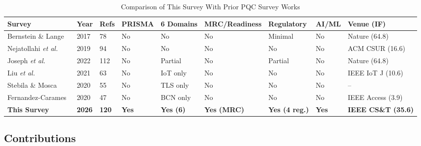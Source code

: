 \documentclass[journal]{IEEEtran}
\begin{document}
\begin{table}[t]
\caption{Comparison of This Survey With Prior PQC Survey Works}
\label{tab:survey_comparison}
\centering
\footnotesize
\renewcommand{\arraystretch}{1.2}
\begin{tabular}{@{}L{3.0cm}C{1.2cm}C{1.2cm}C{1.2cm}C{1.2cm}C{1.4cm}C{1.2cm}C{1.2cm}C{1.4cm}@{}}
\toprule
\textbf{Survey} & \textbf{Year} & \textbf{Refs} & \textbf{PRISMA} & \textbf{6 Domains} & \textbf{MRC/Readiness} & \textbf{Regulatory} & \textbf{AI/ML} & \textbf{Venue (IF)} \\
\midrule
Bernstein \& Lange~\cite{bernstein2017postquantum} & 2017 & 78 & No & No & No & Minimal & No & Nature (64.8) \\
Nejatollahi \emph{et al.}~\cite{nejatollahi2019post} & 2019 & 94 & No & No & No & No & No & ACM CSUR (16.6) \\
Joseph \emph{et al.}~\cite{joseph2022transitioning} & 2022 & 112 & No & Partial & No & Partial & No & Nature (64.8) \\
Liu \emph{et al.}~\cite{liu2021pqc} & 2021 & 63 & No & IoT only & No & No & No & IEEE IoT J (10.6) \\
Stebila \& Mosca~\cite{stebila2020postquantum} & 2020 & 55 & No & TLS only & No & No & No & -- \\
Fernandez-Carames~\cite{fernandezcarames2020review} & 2020 & 47 & No & BCN only & No & No & No & IEEE Access (3.9) \\
\midrule
\textbf{This Survey} & \textbf{2026} & \textbf{120} & \textbf{Yes} & \textbf{Yes (6)} & \textbf{Yes (MRC)} & \textbf{Yes (4 reg.)} & \textbf{Yes} & \textbf{IEEE CS\&T (35.6)} \\
\bottomrule
\end{tabular}
\end{table}

\subsection{Contributions}
\end{document}
